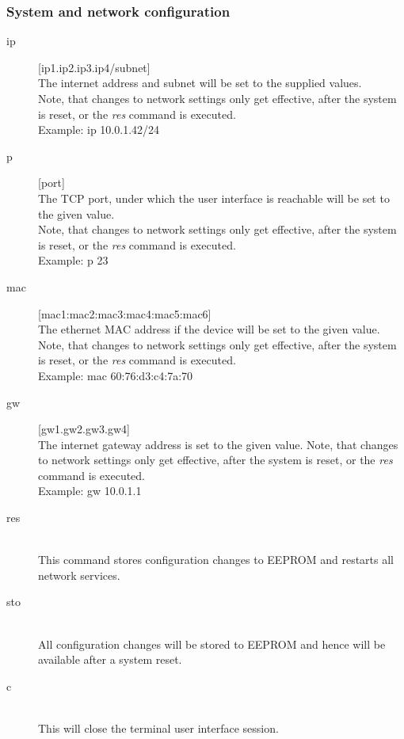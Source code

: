 \documentclass[a4paper]{scrreprt}
\begin{document}
\subsubsection{System and network configuration}
\begin{description}
  \item[ip] [ip1.ip2.ip3.ip4/subnet]\\
    The internet address and subnet will be set to the supplied
    values.\\
    Note, that changes to network settings only get effective, after the system
    is reset, or the \emph{res} command is executed.\\
    Example: ip 10.0.1.42/24
  \item[p] [port]\\
    The TCP port, under which the user interface is reachable will be
    set to the given value.\\
    Note, that changes to network settings only get effective, after the system
    is reset, or the \emph{res} command is executed.\\
    Example: p 23
  \item[mac] [mac1:mac2:mac3:mac4:mac5:mac6]\\
    The ethernet MAC address if the device will be set to the given value.\\
    Note, that changes to network settings only get effective, after the system
    is reset, or the \emph{res} command is executed.\\
    Example: mac 60:76:d3:c4:7a:70
  \item[gw] [gw1.gw2.gw3.gw4]\\
    The internet gateway address is set to the given value.
    Note, that changes to network settings only get effective, after the system
    is reset, or the \emph{res} command is executed.\\
    Example: gw 10.0.1.1
  \item[res]\hspace{1cm}\\
    This command stores configuration changes to EEPROM and restarts all network
    services.
  \item[sto]\hspace{1cm}\\
    All configuration changes will be stored to EEPROM and hence will be available
    after a system reset.
  \item[c]\hspace{1cm}\\
    This will close the terminal user interface session.
\end{description}
\end{document}
